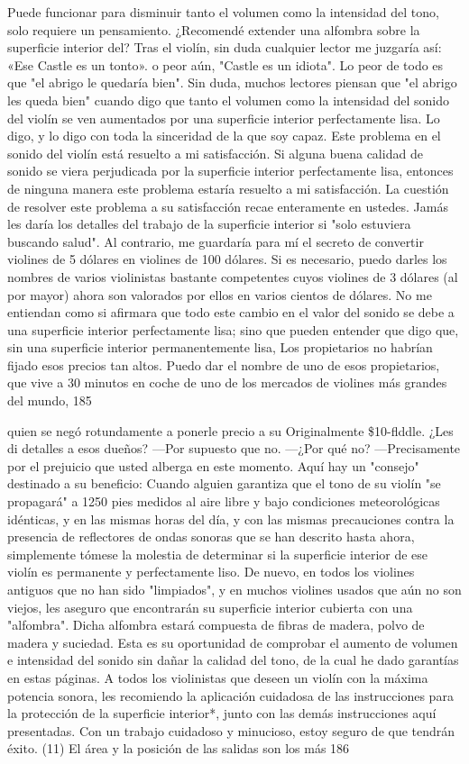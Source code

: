 Puede funcionar para disminuir tanto el volumen como la intensidad del tono, solo requiere un pensamiento. ¿Recomendé extender una alfombra sobre la superficie interior del?
Tras el violín, sin duda cualquier lector me juzgaría así: «Ese Castle es un tonto».
o peor aún, "Castle es un idiota". Lo peor de todo es que "el abrigo le quedaría bien". Sin duda, muchos lectores piensan que "el abrigo les queda bien" cuando digo que tanto el volumen como la intensidad del sonido del violín se ven aumentados por una superficie interior perfectamente lisa. Lo digo, y lo digo con toda la sinceridad de la que soy capaz. Este problema en el sonido del violín está resuelto a mi satisfacción. Si alguna buena calidad de sonido se viera perjudicada por la superficie interior perfectamente lisa, entonces de ninguna manera este problema estaría resuelto a mi satisfacción. La cuestión de resolver este problema a su satisfacción recae enteramente en ustedes. Jamás les daría los detalles del trabajo de la superficie interior si "solo estuviera buscando salud". Al contrario, me guardaría para mí el secreto de convertir violines de 5 dólares en violines de 100 dólares. Si es necesario, puedo darles los nombres de varios violinistas bastante competentes cuyos violines de 3 dólares (al por mayor) ahora son valorados por ellos en varios cientos de dólares. No me entiendan como si afirmara que todo este cambio en el valor del sonido se debe a una superficie interior perfectamente lisa; sino que pueden entender que digo que, sin una superficie interior permanentemente lisa, Los propietarios no habrían fijado esos precios tan altos. Puedo dar el nombre de uno de esos propietarios, que vive a 30 minutos en coche de uno de los mercados de violines más grandes del mundo,
185

quien se negó rotundamente a ponerle precio a su
Originalmente \$10-flddle.
¿Les di detalles a esos dueños? —Por supuesto que no. —¿Por qué no? —Precisamente por el prejuicio que usted alberga en este momento.
Aquí hay un "consejo" destinado a su beneficio: Cuando alguien garantiza que el tono de su violín "se propagará" a 1250 pies medidos al aire libre y bajo condiciones meteorológicas idénticas, y en las mismas horas del día, y con las mismas precauciones contra la presencia de reflectores de ondas sonoras que se han descrito hasta ahora, simplemente tómese la molestia de determinar si la superficie interior de ese violín es permanente y perfectamente
liso.
De nuevo, en todos los violines antiguos que no han sido "limpiados", y en muchos violines usados que aún no son viejos, les aseguro que encontrarán su superficie interior cubierta con una "alfombra". Dicha alfombra estará compuesta de fibras de madera, polvo de madera y suciedad. Esta es su oportunidad de comprobar el aumento de volumen e intensidad del sonido sin dañar la calidad del tono, de la cual he dado garantías en estas páginas. A todos los violinistas que deseen un violín con la máxima potencia sonora, les recomiendo la aplicación cuidadosa de las instrucciones para la protección de la superficie interior*, junto con las demás instrucciones aquí presentadas. Con un trabajo cuidadoso y minucioso, estoy seguro de que tendrán éxito.
(11) El área y la posición de las salidas son los más
186

